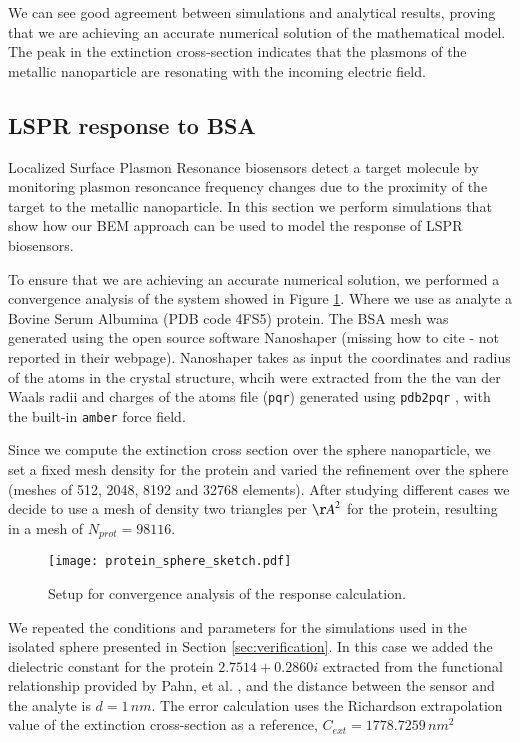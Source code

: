 We can see good agreement between simulations and analytical results, proving
that we are achieving an accurate numerical solution of the mathematical model. The 
peak in the extinction cross-section indicates that the plasmons of the metallic
nanoparticle are resonating with the incoming electric field.


\subsection{LSPR response to BSA} \label{sec:lspr_response}

Localized Surface Plasmon Resonance biosensors detect a target molecule by monitoring
plasmon resoncance frequency changes due to the proximity of the target to the metallic
nanoparticle. In this section we perform simulations that show how our BEM approach
can be used to model the response of LSPR biosensors.

To ensure that we are achieving an accurate numerical solution, we performed a 
convergence analysis of the system showed in Figure \ref{fig:setup_conv}. Where
we use as analyte a Bovine Serum Albumina (PDB code 4FS5) protein. The BSA mesh
was generated using the open source software Nanoshaper (missing how to cite - not
reported in their webpage). Nanoshaper takes as input the coordinates and radius
of the atoms in the crystal structure, whcih were extracted from the the van der
Waals radii and charges of the atoms file (\texttt{pqr}) generated using 
\texttt{pdb2pqr} \cite{Dolinsky04}, with the built-in \texttt{amber} force field.

Since we compute the extinction cross section over the sphere nanoparticle, we 
set a fixed mesh density for the protein and varied the refinement over the
sphere (meshes of 512, 2048, 8192 and 32768 elements). After studying different 
cases we decide to use a mesh of density two triangles per ${\AA}^2$ for 
the protein, resulting in a mesh of $N_{prot} = 98116$. 


\begin{figure}[h] %
   \centering
   \texttt{[image: protein\_sphere\_sketch.pdf]} 
   \caption{Setup for convergence analysis of the response calculation.}
   \label{fig:setup_conv}
\end{figure}

We repeated the conditions and parameters for the simulations used in the isolated
sphere presented in Section \ref{sec:verification}. In this case we added the 
dielectric constant for the protein $2.7514 + 0.2860i$ extracted from the 
functional relationship provided by Pahn, et al. \cite{PahnETal2013}, and the 
distance between the sensor and the analyte is $d=1 \, nm$. The error calculation
uses the Richardson extrapolation value of the extinction cross-section as a
reference, $C_{ext}= 1778.7259 \, nm^2$


